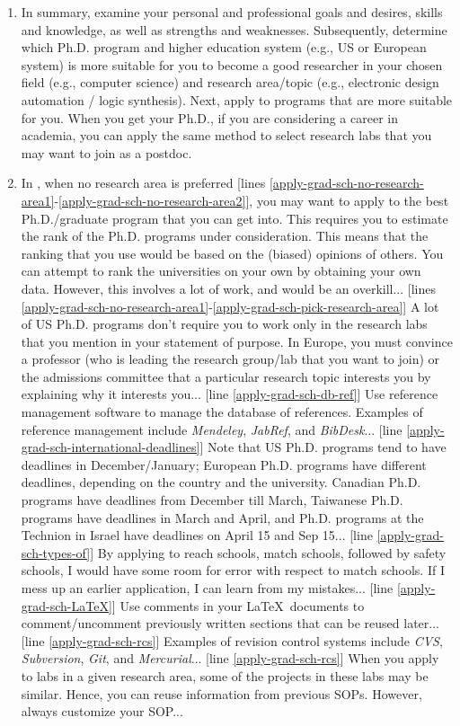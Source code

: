 \begin{enumerate}
\item In summary, examine your personal and professional goals and desires, skills and knowledge, as well as strengths and weaknesses. Subsequently, determine which Ph.D. program and higher education system (e.g., US or European system) is more suitable for you to become a good researcher in your chosen field (e.g., computer science) and research area/topic (e.g., electronic design automation / logic synthesis). Next, apply to programs that are more suitable for you. When you get your Ph.D., if you are considering a career in academia, you can apply the same method to select research labs that you may want to join as a postdoc.
\item In , when no research area is preferred [lines \ref{apply-grad-sch-no-research-area1}-\ref{apply-grad-sch-no-research-area2}], you may want to apply to the best Ph.D./graduate program that you can get into. This requires you to estimate the rank of the Ph.D. programs under consideration. This means that the ranking that you use would be based on the (biased) opinions of others. You can attempt to rank the universities on your own by obtaining your own data. However, this involves a lot of work, and would be an overkill... [lines \ref{apply-grad-sch-no-research-area1}-\ref{apply-grad-sch-pick-research-area}] A lot of US Ph.D. programs don't require you to work only in the research labs that you mention in your statement of purpose. In Europe, you must convince a professor (who is leading the research group/lab that you want to join) or the admissions committee that a particular research topic interests you by explaining why it interests you... [line \ref{apply-grad-sch-db-ref}] Use reference management software to manage the database of references. Examples of reference management include {\it Mendeley}, {\it JabRef}, and {\it BibDesk}... [line \ref{apply-grad-sch-international-deadlines}] Note that US Ph.D. programs tend to have deadlines in December/January; European Ph.D. programs have different deadlines, depending on the country and the university. Canadian Ph.D. programs have deadlines from December till March, Taiwanese Ph.D. programs have deadlines in March and April, and Ph.D. programs at the Technion in Israel have deadlines on April 15 and Sep 15... [line \ref{apply-grad-sch-types-of}] By applying to reach schools, match schools, followed by safety schools, I would have some room for error with respect to match schools. If I mess up an earlier application, I can learn from my mistakes... [line \ref{apply-grad-sch-LaTeX}] Use comments in your \LaTeX\ documents to comment/uncomment previously written sections that can be reused later... [line \ref{apply-grad-sch-rcs}] Examples of revision control systems include {\it CVS}, {\it Subversion}, {\it Git}, and {\it Mercurial}... [line \ref{apply-grad-sch-rcs}] When you apply to labs in a given research area, some of the projects in these labs may be similar. Hence, you can reuse information from previous SOPs. However, always customize your SOP... 
\end{enumerate}


